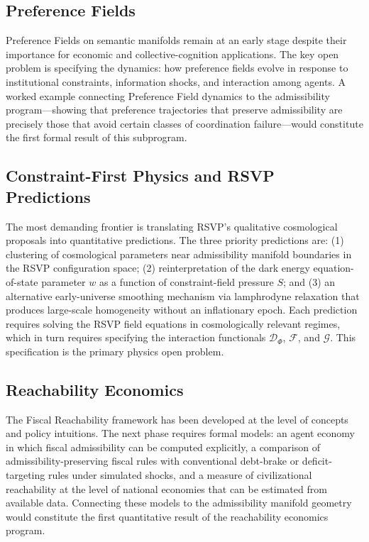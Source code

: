 \documentclass[11pt, oneside]{book}
\theoremstyle{definition}
\theoremstyle{remark}
\begin{document}
\subsection*{Preference Fields}

Preference Fields on semantic manifolds remain at an early stage despite their importance for economic and collective-cognition applications. The key open problem is specifying the dynamics: how preference fields evolve in response to institutional constraints, information shocks, and interaction among agents. A worked example connecting Preference Field dynamics to the admissibility program---showing that preference trajectories that preserve admissibility are precisely those that avoid certain classes of coordination failure---would constitute the first formal result of this subprogram.

\subsection*{Constraint-First Physics and RSVP Predictions}

The most demanding frontier is translating RSVP's qualitative cosmological proposals into quantitative predictions. The three priority predictions are: (1) clustering of cosmological parameters near admissibility manifold boundaries in the RSVP configuration space; (2) reinterpretation of the dark energy equation-of-state parameter $w$ as a function of constraint-field pressure $S$; and (3) an alternative early-universe smoothing mechanism via lamphrodyne relaxation that produces large-scale homogeneity without an inflationary epoch. Each prediction requires solving the RSVP field equations in cosmologically relevant regimes, which in turn requires specifying the interaction functionals $\mathcal{D}_\Phi$, $\mathcal{F}$, and $\mathcal{G}$. This specification is the primary physics open problem.

\subsection*{Reachability Economics}

The Fiscal Reachability framework has been developed at the level of concepts and policy intuitions. The next phase requires formal models: an agent economy in which fiscal admissibility can be computed explicitly, a comparison of admissibility-preserving fiscal rules with conventional debt-brake or deficit-targeting rules under simulated shocks, and a measure of civilizational reachability at the level of national economies that can be estimated from available data. Connecting these models to the admissibility manifold geometry would constitute the first quantitative result of the reachability economics program.
\end{document}

